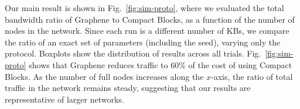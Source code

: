 Our main result is shown in
Fig.~\ref{fig:sim-proto}, where we evaluated the total bandwidth ratio of
Graphene to Compact Blocks, as a function of
the number of nodes in the network. Since each run is a different
number of KBs, we compare the ratio of an exact set of parameters
(including the seed), varying only the protocol.  Boxplots
show the
distribution of results across all
trials. Fig.~\ref{fig:sim-proto} shows that Graphene reduces traffic to  60\% of the cost of using Compact Blocks.  As the number of full nodes increases along the $x$-axis, the ratio of total traffic in the network remains steady, suggesting that our results are representative of larger networks.


